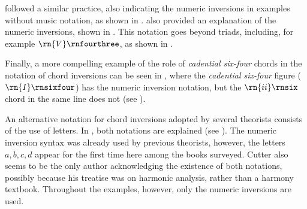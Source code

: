 

\textcite{chadwick1897harmony} followed a similar practice,
also indicating the numeric inversions in examples without
music notation, as shown in
.
\textcite{chadwick1897harmony} also provided an explanation
of the numeric inversions, shown in
. This
notation goes beyond triads, including, for example
$\rn{V}\rnfourthree$, as shown in
.

Finally, a more compelling example of the role of
\emph{cadential six-four} chords in the notation of chord
inversions can be seen in \textcite{loewengard1908lehrbuch},
where the \emph{cadential six-four} figure
($\rn{I}\rnsixfour$) has the numeric inversion notation, but
the $\rn{ii}\rnsix$ chord in the same line does not (see
).





An alternative notation for chord inversions adopted by
several theorists consists of the use of letters. In
\textcite{cutter1902harmonic}, both notations are explained
(see ). The
numeric inversion syntax was already used by previous
theorists, however, the letters ${a, b, c , d}$ appear for
the first time here among the books surveyed. Cutter also
seems to be the only author acknowledging the existence of
both notations, possibly because his treatise was on
harmonic analysis, rather than a harmony textbook.
Throughout the examples, however, only the numeric
inversions are used.

